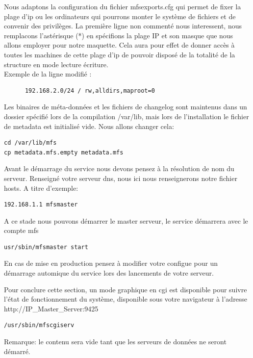 \documentclass[12pt]{report}
\begin{document}
Nous adaptons la configuration du fichier mfsexports.cfg qui permet de fixer la plage d'ip ou les ordinateurs qui pourrons monter le système de fichiers et de convenir des privilèges.
La première ligne non commenté nous interessent, nous remplacons l'astérisque (*) en spécifions la plage IP et son masque que nous allons employer pour notre maquette.
Cela aura pour effet de donner accès à toutes les machines de cette plage d'ip de pouvoir disposé de la totalité de la structure en mode lecture écriture.\\
Exemple de la ligne modifié :
\begin{lstlisting}
	  192.168.2.0/24 / rw,alldirs,maproot=0
	  \end{lstlisting}
Les binaires de méta-données et les fichiers de changelog sont maintenus dans un dossier spécifié lors de la compilation /var/lib, mais lors de l'installation le fichier de metadata est initialisé vide.
Nous allons changer cela: 
\begin{lstlisting}
cd /var/lib/mfs
cp metadata.mfs.empty metadata.mfs
	  \end{lstlisting}
Avant le démarrage du service nous devons pensez à la résolution de nom du serveur. Renseigné votre serveur dns, nous ici nous renseignerons notre fichier hosts.
A titre d'exemple:
  \begin{lstlisting}
192.168.1.1 mfsmaster
	  \end{lstlisting}
A ce stade nous pouvons démarrer le master serveur, le service démarrera avec le compte mfs
  \begin{lstlisting}
usr/sbin/mfsmaster start
	  \end{lstlisting}
En cas de mise en production pensez à modifier votre configue pour un démarrage automique du service lors des lancements de votre serveur.

Pour conclure cette section, un mode graphique en cgi est disponible pour suivre l'état de fonctionnement du système, disponible sous votre navigateur à l'adresse http://IP\_Master\_Server:9425
  \begin{lstlisting}
/usr/sbin/mfscgiserv
	  \end{lstlisting}
Remarque: le contenu sera vide tant que les serveurs de données ne seront démarré.

		

\end{document}

